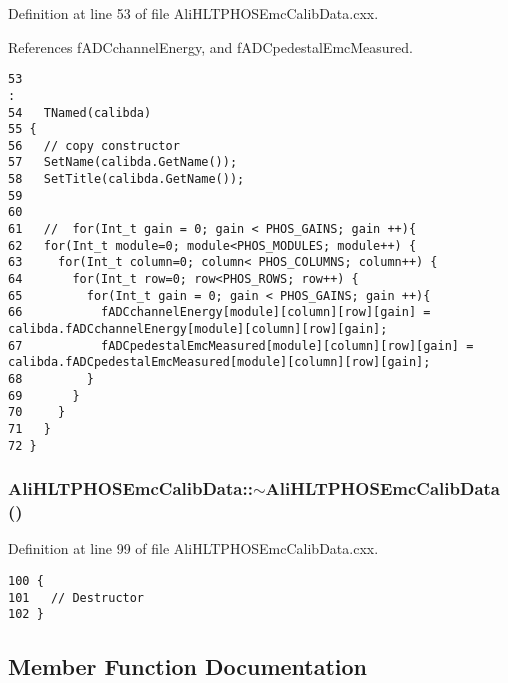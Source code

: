 Definition at line 53 of file Ali\-HLTPHOSEmc\-Calib\-Data.cxx.

References f\-ADCchannel\-Energy, and f\-ADCpedestal\-Emc\-Measured.

\footnotesize\begin{verbatim}53                                                                                     :
54   TNamed(calibda)
55 {
56   // copy constructor
57   SetName(calibda.GetName());
58   SetTitle(calibda.GetName());
59 
60 
61   //  for(Int_t gain = 0; gain < PHOS_GAINS; gain ++){
62   for(Int_t module=0; module<PHOS_MODULES; module++) {
63     for(Int_t column=0; column< PHOS_COLUMNS; column++) {
64       for(Int_t row=0; row<PHOS_ROWS; row++) {
65         for(Int_t gain = 0; gain < PHOS_GAINS; gain ++){
66           fADCchannelEnergy[module][column][row][gain] =  calibda.fADCchannelEnergy[module][column][row][gain];
67           fADCpedestalEmcMeasured[module][column][row][gain] = calibda.fADCpedestalEmcMeasured[module][column][row][gain];
68         }
69       }  
70     }
71   }
72 }
\end{verbatim}\normalsize 


\subsubsection{\setlength{\rightskip}{0pt plus 5cm}Ali\-HLTPHOSEmc\-Calib\-Data::$\sim${\bf Ali\-HLTPHOSEmc\-Calib\-Data} ()\hspace{0.3cm}{\tt  [virtual]}}\label{classAliHLTPHOSEmcCalibData_AliHLTPHOSEmcCalibDataa4}




Definition at line 99 of file Ali\-HLTPHOSEmc\-Calib\-Data.cxx.

\footnotesize\begin{verbatim}100 {
101   // Destructor
102 }
\end{verbatim}\normalsize 




\subsection{Member Function Documentation}
